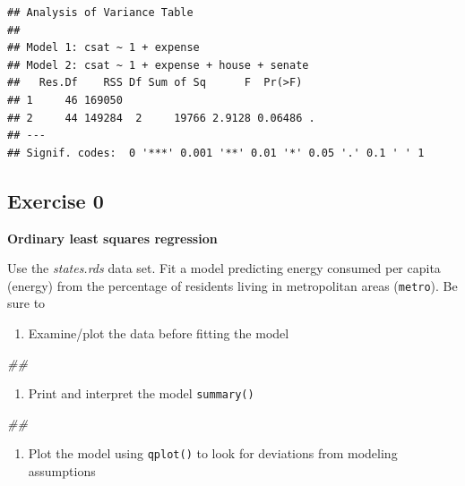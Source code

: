 \documentclass[
]{book}
\newenvironment{Shaded}{\begin{snugshade}}{\end{snugshade}}
\newcommand{\CommentTok}[1]{\textcolor[rgb]{0.56,0.35,0.01}{\textit{#1}}}
\providecommand{\tightlist}{%
  \setlength{\itemsep}{0pt}\setlength{\parskip}{0pt}}
\begin{document}
\begin{verbatim}
## Analysis of Variance Table
## 
## Model 1: csat ~ 1 + expense
## Model 2: csat ~ 1 + expense + house + senate
##   Res.Df    RSS Df Sum of Sq      F  Pr(>F)  
## 1     46 169050                              
## 2     44 149284  2     19766 2.9128 0.06486 .
## ---
## Signif. codes:  0 '***' 0.001 '**' 0.01 '*' 0.05 '.' 0.1 ' ' 1
\end{verbatim}

\hypertarget{exercise-0-1}{%
\subsection{Exercise 0}\label{exercise-0-1}}

\textbf{Ordinary least squares regression}

Use the \emph{states.rds} data set. Fit a model predicting energy consumed per capita (energy) from the percentage of residents living in metropolitan areas (\texttt{metro}). Be sure to

\begin{enumerate}
\def\labelenumi{\arabic{enumi}.}
\tightlist
\item
  Examine/plot the data before fitting the model
\end{enumerate}

\begin{Shaded}
\begin{Highlighting}[]
\CommentTok{\#\# }
\end{Highlighting}
\end{Shaded}

\begin{enumerate}
\def\labelenumi{\arabic{enumi}.}
\setcounter{enumi}{1}
\tightlist
\item
  Print and interpret the model \texttt{summary()}
\end{enumerate}

\begin{Shaded}
\begin{Highlighting}[]
\CommentTok{\#\# }
\end{Highlighting}
\end{Shaded}

\begin{enumerate}
\def\labelenumi{\arabic{enumi}.}
\setcounter{enumi}{2}
\tightlist
\item
  Plot the model using \texttt{qplot()} to look for deviations from modeling assumptions
\end{enumerate}
\end{document}
